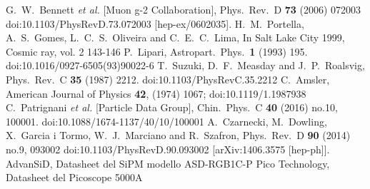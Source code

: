 \begin{thebibliography}{9}
G.~W.~Bennett {\it et al.} [Muon g-2 Collaboration],
Phys.\ Rev.\ D {\bf 73} (2006) 072003
doi:10.1103/PhysRevD.73.072003
[hep-ex/0602035].
H.~M.~Portella, A.~S.~Gomes, L.~C.~S.~Oliveira and C.~E.~C.~Lima,
In Salt Lake City 1999, Cosmic ray, vol. 2 143-146
P.~Lipari,
Astropart.\ Phys.\  {\bf 1} (1993) 195.
doi:10.1016/0927-6505(93)90022-6
T.~Suzuki, D.~F.~Measday and J.~P.~Roalsvig,
Phys.\ Rev.\ C {\bf 35} (1987) 2212.
doi:10.1103/PhysRevC.35.2212
C.~Amsler, 
American Journal of Physics {\bf 42}, (1974) 1067;  
doi:10.1119/1.1987938
C.~Patrignani {\it et al.} [Particle Data Group],
Chin.\ Phys.\ C {\bf 40} (2016) no.10,  100001.
doi:10.1088/1674-1137/40/10/100001
A.~Czarnecki, M.~Dowling, X.~Garcia i Tormo, W.~J.~Marciano and R.~Szafron,
Phys.\ Rev.\ D {\bf 90} (2014) no.9,  093002
doi:10.1103/PhysRevD.90.093002
[arXiv:1406.3575 [hep-ph]].
AdvanSiD,
Datasheet del SiPM modello ASD-RGB1C-P
Pico Technology,
Datasheet del Picoscope 5000A
\end{thebibliography}
